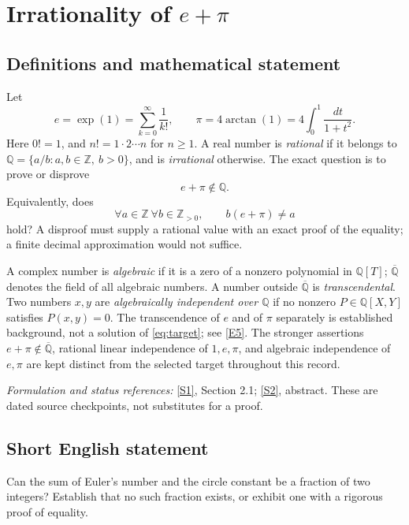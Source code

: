 \documentclass[11pt]{article}
\newcommand{\Q}{\mathbb Q}
\newcommand{\Z}{\mathbb Z}
\newcommand{\Qbar}{\overline{\mathbb Q}}
\begin{document}
\section*{\texorpdfstring{Irrationality of $e+\pi$}{Irrationality of e+pi}}
\label{problem:pi-plus-e}

\subsection{Definitions and mathematical statement}
Let
\[
 e=\exp(1)=\sum_{k=0}^{\infty}\frac1{k!},\qquad
 \pi=4\arctan(1)=4\int_0^1\frac{dt}{1+t^2}.
\]
Here $0!=1$, and $n!=1\cdot2\cdots n$ for $n\ge1$. A real number is
\emph{rational} if it belongs to
$\Q=\{a/b:a,b\in\Z,\ b>0\}$, and is \emph{irrational} otherwise.
The exact question is to prove or disprove
\begin{equation}\label{eq:target}
 \boxed{e+\pi\notin\Q.}
\end{equation}
Equivalently, does
\[
 \forall a\in\Z\ \forall b\in\Z_{>0},\qquad b(e+\pi)\ne a
\]
hold? A disproof must supply a rational value with an exact proof of the
equality; a finite decimal approximation would not suffice.

A complex number is \emph{algebraic} if it is a zero of a nonzero polynomial
in $\Q[T]$; $\Qbar$ denotes the field of all algebraic numbers. A number
outside $\Qbar$ is \emph{transcendental}. Two numbers $x,y$ are
\emph{algebraically independent over $\Q$} if no nonzero
$P\in\Q[X,Y]$ satisfies $P(x,y)=0$.
The transcendence of $e$ and of $\pi$ separately is established background,
not a solution of \eqref{eq:target}; see
\href{https://webusers.imj-prg.fr/~michel.waldschmidt/articles/pdf/ColloquiumDeGiorgiSchanuelConjecture2014.pdf}{[E5]}.
The stronger assertions $e+\pi\notin\Qbar$, rational linear independence
of $1,e,\pi$, and algebraic independence of $e,\pi$ are kept distinct
from the selected target throughout this record.

\par\smallskip\textit{Formulation and status references:}
\href{https://arxiv.org/html/2311.00546v2}{[S1]}, Section 2.1;
\href{https://arxiv.org/abs/2606.17303}{[S2]}, abstract.
These are dated source checkpoints, not substitutes for a proof.

\subsection{Short English statement}
Can the sum of Euler's number and the circle constant be a fraction of two
integers? Establish that no such fraction exists, or exhibit one with a
rigorous proof of equality.
\end{document}

